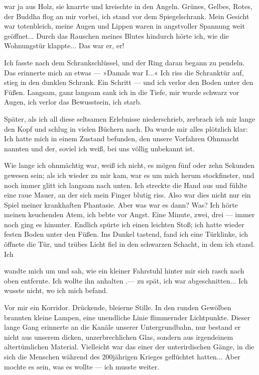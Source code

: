 war ja aus Holz, sie knarrte und kreischte in den Angeln. Grünes,
Gelbes, Rotes, der Buddha flog an mir vorbei, ich stand vor dem
Spiegelschrank. Mein Gesicht war totenbleich, meine Augen und
Lippen waren in angstvoller Spannung weit geöffnet... Durch das
Rauschen meines Blutes hindurch hörte ich, wie die Wohnungstür
klappte... Das war er, er!

Ich fasste nach dem Schrankschlüssel, und der Ring daran begann zu
pendeln. Das erinnerte mich an etwas — »Damals war I...« Ich riss
die Schranktür auf, stieg in den dunklen Schrank. Ein Schritt — und
ich verlor den Boden unter den Füßen. Langsam, ganz langsam sank
ich in die Tiefe, mir wurde schwarz vor Augen, ich verlor das
Bewusstsein, ich starb.

Später, als ich all diese seltsamen Erlebnisse niederschrieb,
zerbrach ich mir lange den Kopf und schlug in vielen Büchern nach.
Da wurde mir alles plötzlich klar: Ich hatte mich in einem Zustand
befunden, den unsere Vorfahren Ohnmacht nannten und der, soviel ich
weiß, bei uns völlig unbekannt ist.

Wie lange ich ohnmächtig war, weiß ich nicht, es mögen fünf oder
zehn Sekunden gewesen sein; als ich wieder zu mir kam, war es um
mich herum stockfinster, und noch immer glitt ich langsam nach
unten. Ich streckte die Hand aus und fühlte eine raue Mauer, an der
sich mein Finger blutig riss. Also war dies nicht nur ein Spiel
meiner krankhaften Phantasie. Aber was war es dann? Was? Ich hörte
meinen keuchenden Atem, ich bebte vor Angst. Eine Minute, zwei,
drei — immer noch ging es hinunter. Endlich spürte ich einen
leichten Stoß; ich hatte wieder festen Boden unter den Füßen. Ins
Dunkel tastend, fand ich eine Türklinke, ich öffnete die Tür, und
trübes Licht fiel in den schwarzen Schacht, in dem ich stand. Ich

wandte mich um und sah, wie ein kleiner Fahrstuhl hinter mir sich
rasch nach oben entfernte. Ich wollte ihn anhalten .— zu spät, ich
war abgeschnitten... Ich wusste nicht, wo ich mich befand.

Vor mir ein Korridor. Drückende, bleierne Stille. In den runden
Gewölben brannten kleine Lampen, eine unendliche Linie flimmernder
Lichtpunkte. Dieser lange Gang erinnerte an die Kanäle unserer
Untergrundbahn, nur bestand er nicht aus unserem dicken,
unzerbrechlichen Glas, sondern aus irgendeinem altertümlichen
Material. Vielleicht war das einer der unterirdischen Gänge, in die
sich die Menschen während des 200jährigen Krieges geflüchtet
hatten... Aber mochte es sein, was es wollte — ich musste weiter.

